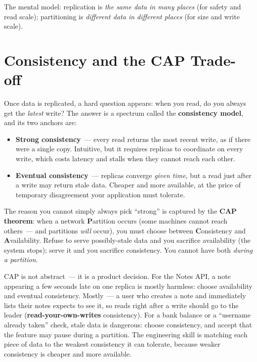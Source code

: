 \noindent{}The mental model: replication is \emph{the same data in many places} (for safety and read scale); partitioning is \emph{different data in different places} (for size and write scale).

\setcounter{section}{3}
\section{Consistency and the CAP Trade-off}\label{40-distributed-systems:404-consistency-and-the-cap-trade-off}

Once data is replicated, a hard question appears: when you read, do you always get the \emph{latest} write? The answer is a spectrum called the \textbf{consistency model}, and its two anchors are:

\begin{itemize}
\tightlist
\item
  \textbf{Strong consistency}~--- every read returns the most recent write, as if there were a single copy. Intuitive, but it requires replicas to coordinate on every write, which costs latency and stalls when they cannot reach each other.
\item
  \textbf{Eventual consistency}~--- replicas converge \emph{given time}, but a read just after a write may return stale data. Cheaper and more available, at the price of temporary disagreement your application must tolerate.
\end{itemize}

\noindent{}The reason you cannot simply always pick ``strong'' is captured by the \textbf{CAP theorem}: when a network \textbf{P}artition occurs (some machines cannot reach others~--- and partitions \emph{will} occur), you must choose between \textbf{C}onsistency and \textbf{A}vailability. Refuse to serve possibly-stale data and you sacrifice availability (the system stops); serve it and you sacrifice consistency. You cannot have both \emph{during a partition}.

CAP is not abstract~--- it is a product decision. For the Notes API, a note appearing a few seconds late on one replica is mostly harmless: choose availability and eventual consistency. Mostly~--- a user who creates a note and immediately lists their notes expects to see it, so reads right after a write should go to the leader (\textbf{read-your-own-writes} consistency). For a bank balance or a ``username already taken'' check, stale data is dangerous: choose consistency, and accept that the feature may pause during a partition. The engineering skill is matching each piece of data to the weakest consistency it can tolerate, because weaker consistency is cheaper and more available.


